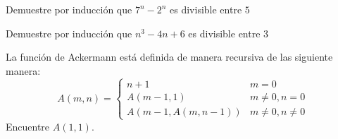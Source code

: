 \begin{problema}
	Demuestre por inducción que 		
	$7^{n}-2^{n}$ es divisible entre $5$
\end{problema}



\begin{problema}
	Demuestre por inducción que 		
	$n^{3}-4n+6$ es divisible entre $3$
\end{problema}



\begin{problema}
	La función de Ackermann está definida de manera recursiva de las siguiente manera:
	$$
	A(m,n)=
	\begin{cases}
		n+1 & m=0\\
		A(m-1,1) & m\neq0, n=0 \\
		A(m-1, A(m,n-1)) & m\neq 0, n\neq 0
	\end{cases}
	$$
	Encuentre $A(1,1)$.		
\end{problema}

